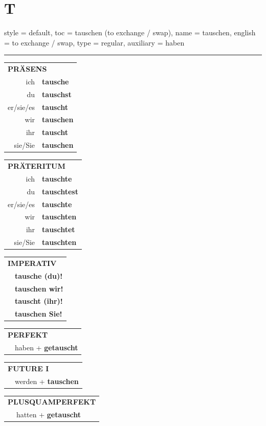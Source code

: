 \section{T}

\begin{verbentry}{
  style = {default},
  toc = {tauschen (to exchange / swap)},
  name = {tauschen},
  english = {to exchange / swap},
  type = {regular},
  auxiliary = {haben}
}


\vspace{5pt}
\hrule
\vspace{5pt}

\begin{tabular}{rl}
\multicolumn{2}{l}{\textbf{PRÄSENS}}\\
ich & \textbf{tausche}\\
du & \textbf{tauschst}\\
er/sie/es & \textbf{tauscht}\\
wir & \textbf{tauschen}\\
ihr & \textbf{tauscht}\\
sie/Sie & \textbf{tauschen}\\
\end{tabular}
\hfill
\begin{tabular}{rl}
\multicolumn{2}{l}{\textbf{PRÄTERITUM}}\\
ich & \textbf{tauschte}\\
du & \textbf{tauschtest}\\
er/sie/es & \textbf{tauschte}\\
wir & \textbf{tauschten}\\
ihr & \textbf{tauschtet}\\
sie/Sie & \textbf{tauschten}\\
\end{tabular}
\hfill
\begin{tabular}{rl}
\multicolumn{2}{l}{\textbf{IMPERATIV}}\\
& \textbf{tausche (du)!}\\
& \textbf{tauschen wir!}\\
& \textbf{tauscht (ihr)!}\\
& \textbf{tauschen Sie!}\\
\end{tabular}

\vspace{10pt}

\begin{tabular}{rl}
\multicolumn{2}{l}{\textbf{PERFEKT}}\\
& haben + \textbf{getauscht}\\
\end{tabular}
\hfill
\begin{tabular}{rl}
\multicolumn{2}{l}{\textbf{FUTURE I}}\\
& werden + \textbf{tauschen}\\
\end{tabular}
\hfill
\begin{tabular}{rl}
\multicolumn{2}{l}{\textbf{PLUSQUAMPERFEKT}}\\
& hatten + \textbf{getauscht}\\
\end{tabular}


\end{verbentry}
